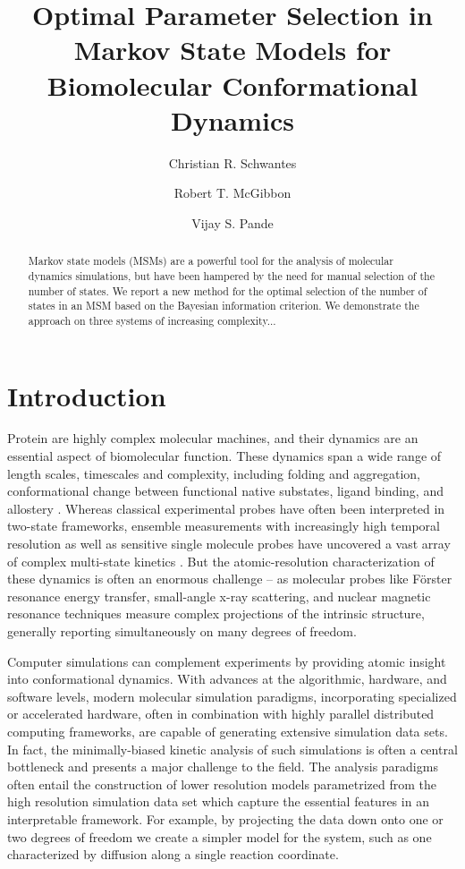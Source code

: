 \documentclass[journal=jpcbfk, layout=twocolumn, manuscript=article]{achemso}
\title{Optimal Parameter Selection in Markov State Models for Biomolecular Conformational Dynamics}
\author{Christian R. Schwantes}
\affiliation{Department of Chemistry, Stanford University, Stanford CA 94305, USA}
\author{Robert T. McGibbon}
\affiliation{Department of Chemistry, Stanford University, Stanford CA 94305, USA}
\author{Vijay S. Pande}
\affiliation{Department of Chemistry, Stanford University, Stanford CA 94305, USA}
\begin{document}
\maketitle
\begin{abstract}
Markov state models (MSMs) are a powerful tool for the analysis of molecular dynamics simulations, but have been hampered by the need for manual selection of the number of states. We report a new method for the optimal selection of the number of states in an MSM based on the Bayesian information criterion. We demonstrate the approach on three systems of increasing complexity...
\end{abstract}

\section{Introduction}
Protein are highly complex molecular machines, and their dynamics are an essential aspect of biomolecular function. These dynamics span a wide range of length scales, timescales and complexity, including folding and aggregation, conformational change between functional native substates, ligand binding, and allostery \cite{Dobson2003Protein, Kim2008Real, Austin1975Dynamics, Bahar2007Intrinsic}. Whereas classical experimental probes have often been interpreted in two-state frameworks, ensemble measurements with increasingly high temporal resolution as well as sensitive single molecule probes have uncovered a vast array of complex multi-state kinetics \cite{Cosa2006Evidence, Zhang2011Direct}. But the atomic-resolution characterization of these dynamics is often an enormous challenge -- as molecular probes like F\"{o}rster resonance energy transfer, small-angle x-ray scattering, and nuclear magnetic resonance techniques measure complex projections of the intrinsic structure, generally reporting simultaneously on many degrees of freedom\cite{Mertens2010Structural, Tzeng2011Protein}.

Computer simulations can complement experiments by providing atomic insight into conformational dynamics. With advances at the algorithmic, hardware, and software levels, modern molecular simulation paradigms, incorporating specialized or accelerated hardware, often in combination with highly parallel distributed computing frameworks, are capable of generating extensive simulation data sets\cite{Eastman2013OpenMM, Shirts2000Screen, Shaw2009Millisecond, Hess2008PLINCS, Buch2010High}. In fact, the minimally-biased kinetic analysis of such simulations is often a central bottleneck and presents a major challenge to the field. The analysis paradigms often entail the construction of lower resolution models parametrized from the high resolution simulation data set which capture the essential features in an interpretable framework\cite{Freddolino2010Challenges, Lane2013Milliseconds}. For example, by projecting the data down onto one or two degrees of freedom we create a simpler model for the system, such as one characterized by diffusion along a single reaction coordinate\cite{Best2010Coordinate}.
\end{document}
